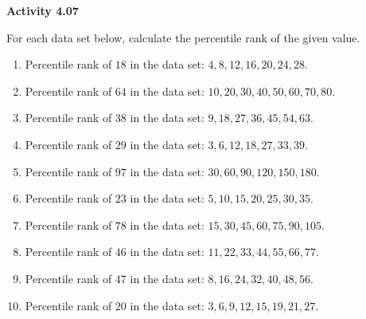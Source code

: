 \vspace{0.3ex}
\noindent\textbf{Activity 4.07}

\vspace{0.2ex}

For each data set below, calculate the percentile rank of the given value.  

\begin{enumerate}
    \item Percentile rank of \(18\) in the data set: \(4, 8, 12, 16, 20, 24, 28\).  
    \item Percentile rank of \(64\) in the data set: \(10, 20, 30, 40, 50, 60, 70, 80\).  
    \item Percentile rank of \(38\) in the data set: \(9, 18, 27, 36, 45, 54, 63\).  
    \item Percentile rank of \(29\) in the data set: \(3, 6, 12, 18, 27, 33, 39\).  
    \item Percentile rank of \(97\) in the data set: \(30, 60, 90, 120, 150, 180\).  
    \item Percentile rank of \(23\) in the data set: \(5, 10, 15, 20, 25, 30, 35\).  
    \item Percentile rank of \(78\) in the data set: \(15, 30, 45, 60, 75, 90, 105\).  
    \item Percentile rank of \(46\) in the data set: \(11, 22, 33, 44, 55, 66, 77\).  
    \item Percentile rank of \(47\) in the data set: \(8, 16, 24, 32, 40, 48, 56\).  
    \item Percentile rank of \(20\) in the data set: \(3, 6, 9, 12, 15, 19, 21, 27\).  
\end{enumerate}
